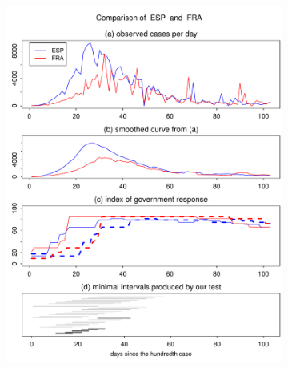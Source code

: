 \documentclass[a4paper,12pt]{article}
\numberwithin{equation}{section}
\begin{document}
\begin{figure}[t!]
\begin{subfigure}[b]{0.475\textwidth}
\includegraphics[width=\textwidth]{plots/ESP_vs_FRA}
\end{subfigure}
\vspace{0.25cm}
\begin{subfigure}[b]{0.475\textwidth}

\end{subfigure}
\end{figure}
\end{document}
